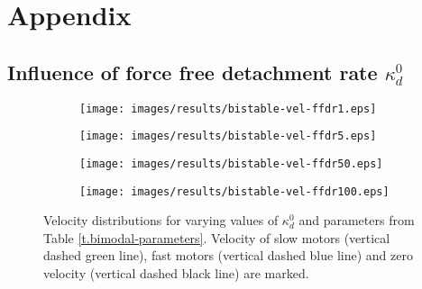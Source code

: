 \appendix
\chapter{Appendix}
\section{Influence of force free detachment rate $\kappa_d^0$}
\begin{figure}[!h]
\centering
\begin{subfigure}{0.35\textwidth}
 \texttt{[image: images/results/bistable-vel-ffdr1.eps]}
\end{subfigure}
\begin{subfigure}{0.35\textwidth}
 \texttt{[image: images/results/bistable-vel-ffdr5.eps]}
\end{subfigure}
\begin{subfigure}{0.35\textwidth}
 \texttt{[image: images/results/bistable-vel-ffdr50.eps]}
\end{subfigure}
\begin{subfigure}{0.35\textwidth}
 \texttt{[image: images/results/bistable-vel-ffdr100.eps]}
\end{subfigure}
\caption[Influence of force free detachment rate $\kappa_d^0$ on bimodal velocity distribution]{Velocity distributions for varying values of $\kappa_d^0$ and parameters from Table \ref{t.bimodal-parameters}. Velocity of slow motors (vertical dashed green line), fast motors (vertical dashed blue line) and zero velocity (vertical dashed black line) are marked.} 
\label{img.bimodal-ffdr-comparison}
\end{figure}
\newpage
